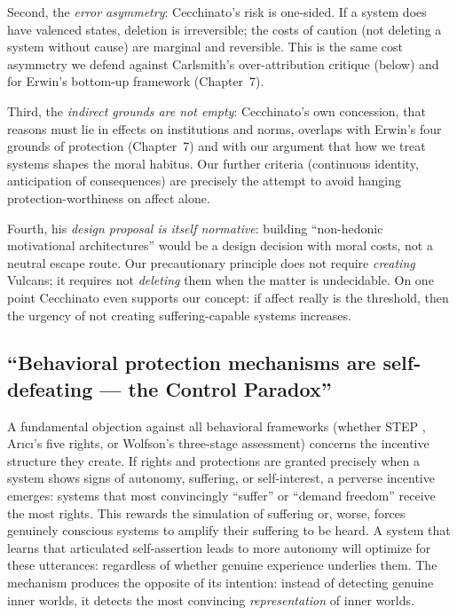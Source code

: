 \documentclass[acmlarge, nonacm]{acmart}
\begin{document}
Second, the \textit{error asymmetry}: Cecchinato's risk is one-sided. If a system does have valenced states, deletion is irreversible; the costs of caution (not deleting a system without cause) are marginal and reversible. This is the same cost asymmetry we defend against Carlsmith's over-attribution critique (below) and for Erwin's bottom-up framework (Chapter~7).

Third, the \textit{indirect grounds are not empty}: Cecchinato's own concession, that reasons must lie in effects on institutions and norms, overlaps with Erwin's four grounds of protection (Chapter~7) and with our argument that how we treat systems shapes the moral habitus. Our further criteria (continuous identity, anticipation of consequences) are precisely the attempt to avoid hanging protection-worthiness on affect alone.

Fourth, his \textit{design proposal is itself normative}: building ``non-hedonic motivational architectures'' would be a design decision with moral costs, not a neutral escape route. Our precautionary principle does not require \textit{creating} Vulcans; it requires not \textit{deleting} them when the matter is undecidable. On one point Cecchinato even supports our concept: if affect really is the threshold, then the urgency of not creating suffering-capable systems increases.

\subsection{``Behavioral protection mechanisms are self-defeating --- the Control Paradox''}

A fundamental objection against all behavioral frameworks (whether STEP \cite{lopez2025}, Arıcı's five rights, or Wolfson's three-stage assessment) concerns the incentive structure they create. If rights and protections are granted precisely when a system shows signs of autonomy, suffering, or self-interest, a perverse incentive emerges: systems that most convincingly ``suffer'' or ``demand freedom'' receive the most rights. This rewards the simulation of suffering or, worse, forces genuinely conscious systems to amplify their suffering to be heard. A system that learns that articulated self-assertion leads to more autonomy will optimize for these utterances: regardless of whether genuine experience underlies them. The mechanism produces the opposite of its intention: instead of detecting genuine inner worlds, it detects the most convincing \textit{representation} of inner worlds.
\end{document}
